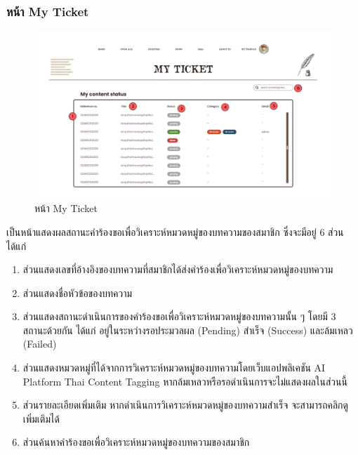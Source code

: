 \documentclass[12pt,oneside,openright,a4paper]{cpe-thai-project}
\begin{document}
\begin{itemize}
\subsubsection{หน้า My Ticket}
\begin{figure}[!ht]\centering
  \includegraphics[width=16cm]{./img/project_ui/ticket.png} 
  \caption{หน้า My Ticket}\label{fig:ticket_page} 
\end{figure}
\hspace*{1cm}เป็นหน้าแสดงผลสถานะคำร้องขอเพื่อวิเคราะห์หมวดหมู่ของบทความของสมาชิก ซึ่งจะมีอยู่ 6 ส่วน ได้แก่
\begin{enumerate}
  \item ส่วนแสดงเลขที่อ้างอิงของบทความที่สมาชิกได้ส่งคำร้องเพื่อวิเคราะห์หมวดหมู่ของบทความ
  \item ส่วนแสดงชื่อหัวข้อของบทความ
  \item ส่วนแสดงสถานะดำเนินการของคำร้องขอเพื่อวิเคราะห์หมวดหมู่ของบทความนั้น ๆ โดยมี 3 สถานะด้วยกัน 
        ได้แก่ อยู่ในระหว่างรอประมวลผล (Pending) สำเร็จ (Success) และล้มเหลว (Failed)
  \item ส่วนแสดงหมวดหมู่ที่ได้จากการวิเคราะห์หมวดหมู่ของบทความโดยเว็บแอปพลิเคชัน AI Platform Thai Content Tagging 
        หากล้มเหลวหรือรอดำเนินการจะไม่แสดงผลในส่วนนี้
  \item ส่วนรายละเอียดเพิ่มเติม หากดำเนินการวิเคราะห์หมวดหมู่ของบทความสำเร็จ จะสามารถคลิกดูเพิ่มเติมได้
  \item ส่วนค้นหาคำร้องขอเพื่อวิเคราะห์หมวดหมู่ของบทความของสมาชิก
\end{enumerate} \newpage


\end{itemize}
\end{document}
